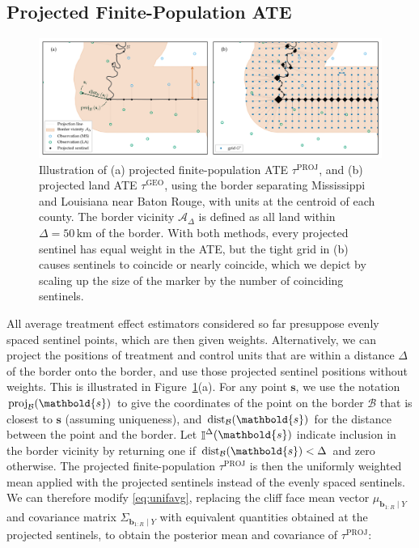 \documentclass[letter]{article}
\makeatletter
\def\maxwidth{\ifdim\Gin@nat@width>\linewidth\linewidth
\else\Gin@nat@width\fi}
\let\Oldincludegraphics\includegraphics
\renewcommand{\includegraphics}[1]{\Oldincludegraphics[width=0.9\maxwidth]{#1}}
\DeclarePairedDelimiter{\parenthesis}{\lparen}{\rparen}
\newcommand{\del}[1]{\parenthesis*{#1}}
\DeclareMathOperator{\Ind}{\mathbb{I}}
\newcommand{\area}{\mathcal{A}}
\newcommand{\svec}{\mathbold{s}}
\newcommand{\border}{\mathcal{B}}
\newcommand{\sentinel}{\bm{b}}
\newcommand{\numsent}{R}
\newcommand{\sentinels}{\sentinel_{1:\numsent}}
\newcommand{\tauproj}{\tau^{\mathrm{PROJ}}}
\newcommand{\taugeo}{\tau^{\mathrm{GEO}}}
\DeclareMathOperator{\proj}{proj}
\DeclareMathOperator{\dist}{dist}
\newcommand{\buffer}{\Delta}
\newcommand{\vicinity}[1]{\Ind^\buffer\del{#1}}
\makeatother
\begin{document}
    	\subsection{Projected Finite-Population ATE}\label{projected-finite-population-ate}
    


    	\begin{figure}
\centering
\includegraphics{../figures/mississippi_projection_methods.png}
\caption{\label{fig:mississippi_projection_methods}
Illustration of (a) projected finite-population ATE \(\tauproj\), and (b) projected land ATE \(\taugeo\), using the border separating Mississippi and Louisiana near Baton Rouge, with units at the centroid of each county.
The border vicinity \(\area_\buffer\) is defined as all land within \(\buffer=50\,\mathrm{km}\) of the border.
With both methods, every projected sentinel has equal weight in the ATE, but the tight grid in (b) causes sentinels to coincide or nearly coincide, which we depict by scaling up the size of the marker by the number of coinciding sentinels.}
\end{figure}
    


    	All average treatment effect estimators considered so far presuppose evenly spaced sentinel points, which are then given weights.
Alternatively, we can project the positions of treatment and control units that are within a distance \(\buffer\) of the border onto the border, and use those projected sentinel positions without weights.
This is illustrated in Figure~\ref{fig:mississippi_projection_methods}(a).
For any point \(\svec\), we use the notation \(\proj_{\border}\del{\svec}\) to give the coordinates of the point on the border \(\border\) that is closest to \(\svec\) (assuming uniqueness), and \(\dist_{\border}\del{\svec}\) for the distance between the point and the border.
Let \(\vicinity{\svec}\) indicate inclusion in the border vicinity by returning one if \(\dist_{\border}\del{\svec} < \buffer\) and zero otherwise.
The projected finite-population \(\tauproj\) is then the uniformly weighted mean applied with the projected sentinels instead of the evenly spaced sentinels.
We can therefore modify \eqref{eq:unifavg}, replacing the cliff face mean vector \(\mu_{\sentinels \mid Y}\)
and covariance matrix \(\Sigma_{\sentinels \mid Y}\)
with equivalent quantities obtained at the projected sentinels,
to obtain the posterior mean and covariance of \(\tauproj\):
\end{document}
